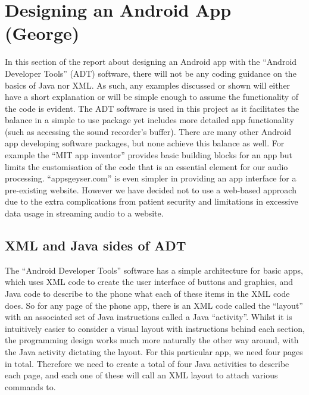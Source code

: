 \section{Designing an Android App (George)}
\label{sec:android-george}
In this section of the report about designing an Android app with the ``Android Developer Tools'' (ADT) software, there will not be any coding guidance on the basics of Java nor XML. As such, any examples discussed or shown will either have a short explanation or will be simple enough to assume the functionality of the code is evident. The ADT software is used in this project as it facilitates the balance in a simple to use package yet includes more detailed app functionality (such as accessing the sound recorder's buffer). There are many other Android app developing software packages, but none achieve this balance as well. For example the ``MIT app inventor'' provides basic building blocks for an app but limits the customisation of the code that is an essential element for our audio processing. ``appsgeyser.com'' is even simpler in providing an app interface for a pre-existing website. However we have decided not to use a web-based approach due to the extra complications from patient security and limitations in excessive data usage in streaming audio to a website.
\subsection{XML and Java sides of ADT}
The ``Android Developer Tools'' software has a simple architecture for basic apps, which uses XML code to create the user interface of buttons and graphics, and Java code to describe to the phone what each of these items in the XML code does\cite[p.~22]{lee2011beg}. So for any page of the phone app, there is an XML code called the ``layout'' with an associated set of Java instructions called a Java ``activity''. Whilst it is intuitively easier to consider a visual layout with instructions behind each section, the programming design works much more naturally the other way around, with the Java activity dictating the layout. For this particular app, we need four pages in total. Therefore we need to create a total of four Java activities to describe each page, and each one of these will call an XML layout to attach various commands to.
